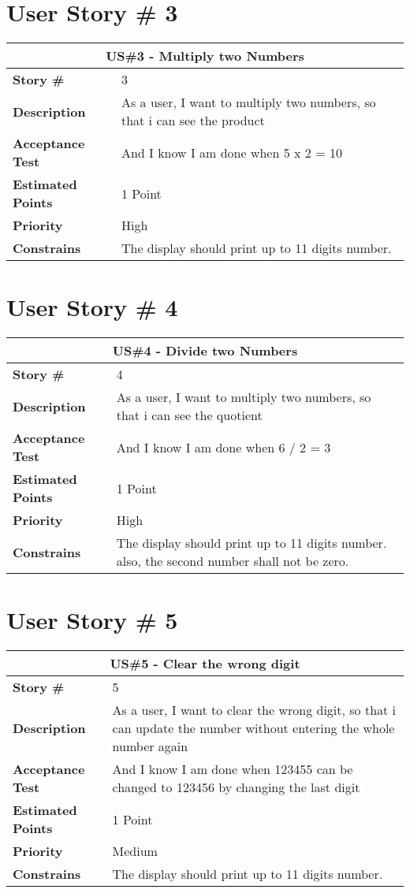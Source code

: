 \documentclass{report}
\begin{document}
\section{User Story \# 3}
\begin{tabular}{|p{3cm}|p{9cm}| }
\hline
\multicolumn{2}{|c|}{US\#3 - Multiply two Numbers} \\
\hline
\textbf {Story \#}& 3\\
\hline
\textbf{Description}& As a user, I want to multiply two numbers, so that i can see the product\\
\hline
\textbf{Acceptance Test}& And I know I am done when 5 x 2 = 10\\
\hline
\textbf{Estimated Points} & 1 Point \\
\hline
\textbf{Priority} & High \\
\hline
\textbf{Constrains}& The display should print up to 11 digits number. \\
\hline
\end{tabular}

\section{User Story \# 4}
\begin{tabular}{|p{3cm}|p{9cm}| }
\hline
\multicolumn{2}{|c|}{US\#4 - Divide two Numbers} \\
\hline
\textbf {Story \#}& 4\\
\hline
\textbf{Description}& As a user, I want to multiply two numbers, so that i can see the quotient\\
\hline
\textbf{Acceptance Test}& And I know I am done when 6 / 2 = 3\\
\hline
\textbf{Estimated Points} & 1 Point \\
\hline
\textbf{Priority} & High \\
\hline
\textbf{Constrains}& The display should print up to 11 digits number. also, the second number shall not be zero.\\
\hline
\end{tabular}

\section{User Story \# 5}
\begin{tabular}{|p{3cm}|p{9cm}| }
\hline
\multicolumn{2}{|c|}{US\#5 - Clear the wrong digit} \\
\hline
\textbf {Story \#}& 5\\
\hline
\textbf{Description}& As a user, I want to clear the wrong digit, so that i can update the number without entering the whole number again\\
\hline
\textbf{Acceptance Test}& And I know I am done when 123455 can be changed to 123456 by changing the last digit \\
\hline
\textbf{Estimated Points} & 1 Point \\
\hline
\textbf{Priority} & Medium \\
\hline
\textbf{Constrains}& The display should print up to 11 digits number.\\
\hline
\end{tabular}
\end{document}
